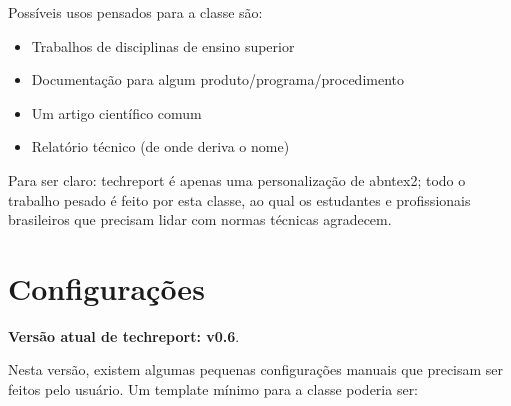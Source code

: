\documentclass[article]{techreport}
\newcommand{\trep}{\textsf{techreport}}
\begin{document}
Possíveis usos pensados para a classe são:

\begin{itemize}
\item Trabalhos de disciplinas de ensino superior
\item Documentação para algum produto/programa/procedimento
\item Um artigo científico comum
\item Relatório técnico (de onde deriva o nome)
\end{itemize}

Para ser claro: \trep{} é apenas uma personalização de \textsf{abntex2}; todo o trabalho pesado é feito por esta classe, ao qual os estudantes e profissionais brasileiros que precisam lidar com normas técnicas agradecem.

\section{Configurações}
\label{sec:configuracoes}

\textbf{Versão atual de techreport: v0.6}.

Nesta versão, existem algumas pequenas configurações manuais que precisam ser feitos pelo usuário. Um template mínimo para a classe poderia ser:
\end{document}
